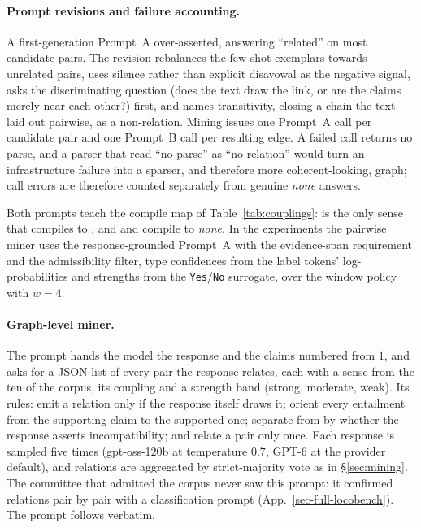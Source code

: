 \paragraph{Prompt revisions and failure accounting.} A first-generation Prompt~A over-asserted,
answering ``related'' on most candidate pairs. The revision rebalances the few-shot exemplars
towards unrelated pairs, uses silence rather than explicit disavowal as the negative signal, asks
the discriminating question (does the text draw the link, or are the claims merely near each
other?) first, and names transitivity, closing a chain the text laid out pairwise, as a
non-relation. Mining issues one Prompt~A call per candidate pair and one Prompt~B call per
resulting edge. A failed call returns no parse, and a parser that read ``no parse'' as ``no
relation'' would turn an infrastructure failure into a sparser, and therefore more coherent-looking,
graph; call errors are therefore counted separately from genuine \emph{none} answers.

Both prompts teach the compile map of Table~\ref{tab:couplings}:  is the only
sense that compiles to \con{}, and  and  compile to \emph{none}.
In the experiments the pairwise miner uses the response-grounded Prompt~A with the evidence-span
requirement and the admissibility filter, type confidences from the label tokens'
log-probabilities and strengths from the \texttt{Yes}/\texttt{No} surrogate, over the window
policy with $w=4$.

\paragraph{Graph-level miner.} The prompt hands the model the response and the claims numbered from
$1$, and asks for a JSON list of every pair the response relates, each with a sense from the ten of
the corpus, its coupling and a strength band (strong, moderate, weak). Its rules: emit a relation
only if the response itself draws it; orient every entailment from the supporting claim to the
supported one; separate  from  by whether the response asserts
incompatibility; and relate a pair only once. Each response is sampled five times (gpt-oss-120b at
temperature $0.7$, GPT-6 at the provider default), and relations are aggregated by strict-majority
vote as in \S\ref{sec:mining}. The committee that admitted the corpus never saw this prompt: it
confirmed relations pair by pair with a classification prompt (App.~\ref{sec-full-locobench}). The
prompt follows verbatim.

